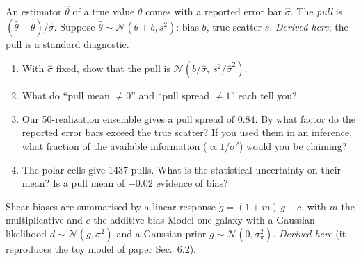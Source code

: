 
\begin{given}
An estimator $\hat\theta$ of a true value $\theta$ comes with a reported error bar $\hat\sigma$. The \emph{pull} is
$(\hat\theta - \theta)/\hat\sigma$. Suppose $\hat\theta \sim \mathcal N(\theta + b, s^2)$: bias $b$, true scatter $s$.
\emph{Derived here}; the pull is a standard diagnostic.
\end{given}


\begin{enumerate}
  \item With $\hat\sigma$ fixed, show that the pull is $\mathcal N(b/\hat\sigma,\ s^2/\hat\sigma^2)$.
  \item What do ``pull mean $\neq 0$'' and ``pull spread $\neq 1$'' each tell you?
  \item Our 50-realization ensemble gives a pull spread of 0.84. By what factor do the reported error bars exceed
    the true scatter? If you used them in an inference, what fraction of the available information
    ($\propto 1/\sigma^2$) would you be claiming?
  \item The polar cells give 1437 pulls. What is the statistical uncertainty on their mean? Is a pull mean of
    $-0.02$ evidence of bias?
\end{enumerate}



\begin{given}
Shear biases are summarised by a linear response $\hat g = (1+m)\,g + c$, with $m$ the multiplicative and $c$ the
additive bias  Model one galaxy with a Gaussian likelihood $d \sim \mathcal N(g, \sigma^2)$ and a
Gaussian prior $g \sim \mathcal N(0, \sigma_\pi^2)$. \emph{Derived here} (it reproduces the toy model of paper
Sec.~6.2).
\end{given}

